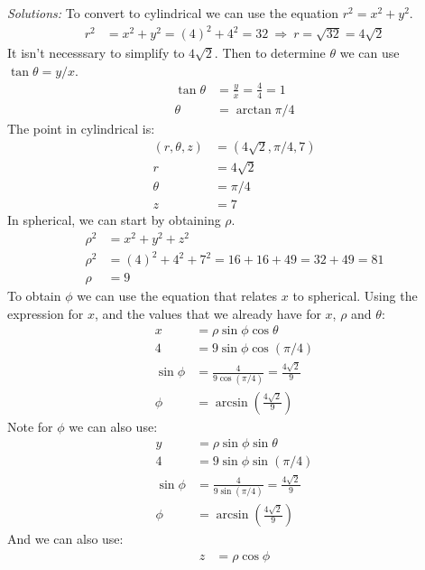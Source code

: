     \ifnum {} {\color{DarkBlue} \textit{Solutions:} To convert to cylindrical we can use the equation $r^2 = x^2 + y^2$. 
    \begin{align}
        r^2 &= x^2 + y^2 = (4)^2 + 4^2 = 32 \ \Rightarrow \ r = \sqrt{32} = 4\sqrt2
    \end{align}
    It isn't necesssary to simplify to $4\sqrt2$. Then to determine $\theta$ we can use $\tan\theta = y/x$. 
    \begin{align}
        \tan \theta &= \frac{y}{x} = \frac{4}{4} = 1  \\
        \theta &= \arctan \pi/4
    \end{align} 
    The point in cylindrical is: 
    \begin{align}
        (r,\theta,z) &= (4\sqrt2,\pi/4,7) \\
        r &= 4\sqrt2 \\
        \theta &= \pi/4 \\
        z &= 7
    \end{align}
    In spherical, we can start by obtaining $\rho$. 
    \begin{align}
        \rho^2 &= x^2+y^2+z^2\\
        \rho^2 &= (4)^2 + 4^2 + 7^2 = 16+16+49 = 32+49 = 81 \\
        \rho &= 9
    \end{align}
    To obtain $\phi$ we can use the equation that relates $x$ to spherical. Using the expression for $x$, and the values that we already have for $x$, $\rho$ and $\theta$:
    \begin{align}
        x &= \rho \sin\phi \cos\theta \\
        4 &= 9\sin\phi \cos(\pi/4) \\
        \sin\phi &= \frac{4}{9 \cos(\pi/4)}  = \frac{4\sqrt2}{9}\\
        \phi &= \arcsin \left(\frac{4\sqrt2}{9}\right)
    \end{align}
    Note for $\phi$ we can also use:
    \begin{align}
        y &= \rho \sin\phi \sin\theta \\
        4 &= 9\sin\phi \sin(\pi/4) \\
        \sin\phi &= \frac{4}{9 \sin(\pi/4)}  = \frac{4\sqrt2}{9}\\
        \phi &= \arcsin \left(\frac{4\sqrt2}{9}\right)
    \end{align}    
    And we can also use:
    \begin{align}
        z &= \rho \cos\phi  \\

\end{align}}
